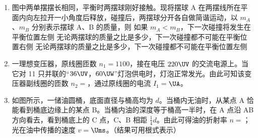 \documentclass[\gkver]{gaokaozhenti}
\begin{document}
\begin{enumerate}
\item
图中两单摆摆长相同，平衡时两摆球刚好接触。现将摆球 A 在两摆线所在平面内向左拉开一小角度后释放，碰撞后，两摆球分开各自做简谐运动，以 $m_{A}$、$m_{B}$ 分别表示摆球 A、B 的质量，则
\onepicture[h=4.24cm]{}
{如果 $m_{A}<m_{B}$，下一次碰撞将发生在平衡位置左侧}
{无论两摆球的质量之比是多少，下一次碰撞都不可能在平衡位置右侧}
{无论两摆球的质量之比是多少，下一次碰撞都不可能在平衡位置左侧}


\item
一理想变压器，原线圈匝数 $n_{1}=1100$，接在电压 $220\UV$ 的交流电源上。当它对 11 只并联的“$36\UV$，$60\UW$”灯泡供电时，灯泡正常发光。由此可知该变压器副线圈的匝数 $n_{2}=$，通过原线圈的电流 $I_{1}=$$\UA$。



\item
如图所示，一储油圆桶，底面直径与桶高均为 $d$。当桶内无油时，从某点 A 恰能看到桶底边缘上的某点 B。当桶内油的深度等于桶高一半时，在 A 点沿 AB 方向看去，看到桶底上的 C 点，C、B 相距 $\frac{1}{4}d$。由此可得油的折射率 $n=$；光在油中传播的速度 $v=$$\Ums$。（结果可用根式表示）
\onepicture[align=right, h=3.62cm]{}


\end{enumerate}
\end{document}
